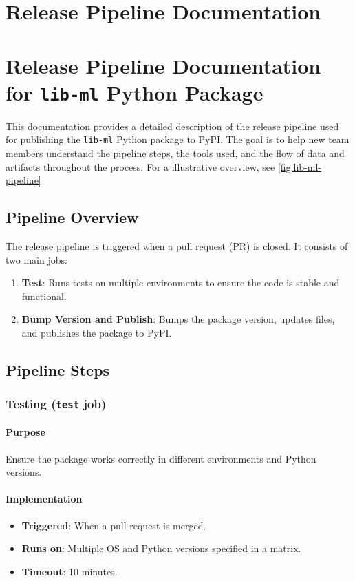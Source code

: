 \section{Release Pipeline Documentation}
\section*{Release Pipeline Documentation for \texttt{lib-ml} Python Package}

This documentation provides a detailed description of the release pipeline used for publishing the \texttt{lib-ml} Python package to PyPI. The goal is to help new team members understand the pipeline steps, the tools used, and the flow of data and artifacts throughout the process. For a illustrative overview, see \autoref{fig:lib-ml-pipeline}

\subsection{Pipeline Overview}

The release pipeline is triggered when a pull request (PR) is closed. It consists of two main jobs:

\begin{enumerate}
    \item \textbf{Test}: Runs tests on multiple environments to ensure the code is stable and functional.
    \item \textbf{Bump Version and Publish}: Bumps the package version, updates files, and publishes the package to PyPI.
\end{enumerate}

\subsection{Pipeline Steps}

\subsubsection{Testing (\texttt{test} job)}

\paragraph{Purpose}
Ensure the package works correctly in different environments and Python versions.

\paragraph{Implementation}
\begin{itemize}
    \item \textbf{Triggered}: When a pull request is merged.
    \item \textbf{Runs on}: Multiple OS and Python versions specified in a matrix.
    \item \textbf{Timeout}: 10 minutes.
\end{itemize}

